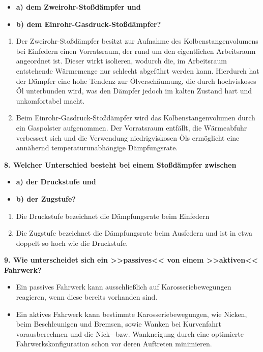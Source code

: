 \begin{itemize}
\item
  \textbf{a) dem Zweirohr-Stoßdämpfer und}
\item
  \textbf{b) dem Einrohr-Gasdruck-Stoßdämpfer?}
\end{itemize}

\begin{enumerate}
\def\labelenumi{\alph{enumi})}
\item
  Der Zweirohr-Stoßdämpfer besitzt zur Aufnahme des
  Kolbenstangenvolumens bei Einfedern einen Vorratsraum, der rund um den
  eigentlichen Arbeitsraum angeordnet ist. Dieser wirkt isolieren,
  wodurch die, im Arbeitsraum entstehende Wärmemenge nur schlecht
  abgeführt werden kann. Hierdurch hat der Dämpfer eine hohe Tendenz zur
  Ölverschäumung, die durch hochviskoses Öl unterbunden wird, was den
  Dämpfer jedoch im kalten Zustand hart und unkomfortabel macht.
\item
  Beim Einrohr-Gasdruck-Stoßdämpfer wird das Kolbenstangenvolumen durch
  ein Gaspolster aufgenommen. Der Vorratsraum entfällt, die Wärmeabfuhr
  verbessert sich und die Verwendung niedrigviskosen Öls ermöglicht eine
  annähernd temperaturunabhängige Dämpfungsrate.
\end{enumerate}

\textbf{8. Welcher Unterschied besteht bei einem Stoßdämpfer zwischen}

\begin{itemize}
\item
  \textbf{a) der Druckstufe und}
\item
  \textbf{b) der Zugstufe?}
\end{itemize}

\begin{enumerate}
\def\labelenumi{\alph{enumi})}
\item
  Die Druckstufe bezeichnet die Dämpfungsrate beim Einfedern
\item
  Die Zugstufe bezeichnet die Dämpfungsrate beim Ausfedern und ist in
  etwa doppelt so hoch wie die Druckstufe.
\end{enumerate}

\textbf{9. Wie unterscheidet sich ein >>passives<< von einem >>aktiven<<
Fahrwerk?}

\begin{itemize}
\item
  Ein passives Fahrwerk kann ausschließlich auf Karosseriebewegungen
  reagieren, wenn diese bereits vorhanden sind.
\item
  Ein aktives Fahrwerk kann bestimmte Karosseriebewegungen, wie Nicken,
  beim Beschleunigen und Bremsen, sowie Wanken bei Kurvenfahrt
  vorausberechnen und die Nick-- bzw. Wankneigung durch eine optimierte
  Fahrwerkskonfiguration schon vor deren Auftreten minimieren.
\end{itemize}

